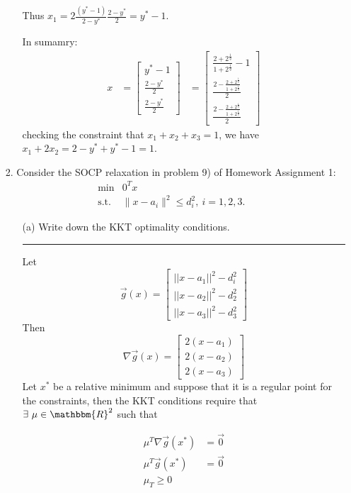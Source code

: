 \documentclass{article} %
\newcommand{\R}{\mathbbm{R}}
\begin{document}
\begin{enumerate}
\begin{itemize}
Thus $x_1 = 2 \frac{(y^{*} - 1) }{ 2 - y^{*}}  \frac{2 - y^{*}}{2} = y^{*} - 1$. 

In sumamry:
\begin{equation*}
\begin{aligned}
x &= \begin{bmatrix}  y^{*} - 1 \\ \frac{2 - y^{*}}{2} \\ \frac{2 - y^{*}}{2} \end{bmatrix} 
&= \begin{bmatrix} \frac{2 + 2^{\frac{1}{q}}}{1 + 2^{\frac{1}{q}}} - 1 \\ \frac{2 - \frac{2 + 2^{\frac{1}{q}}}{1 + 2^{\frac{1}{q}}}}{2} \\ \frac{2 - \frac{2 + 2^{\frac{1}{q}}}{1 + 2^{\frac{1}{q}}}}{2} \end{bmatrix} 
\end{aligned}
\end{equation*}
checking the constraint that $x_1 + x_2 + x_3 = 1$, we have $x_1 + 2x_2 = 2 - y^{*} + y^{*} - 1 = 1$. 


\end{itemize}

\item[2.] Consider the SOCP relaxation in problem 9) of Homework Assignment 1:
\[\begin{array}{rcl}
\min          & 0^Tx &\\
\mbox{s.t.} &\|x-a_i\|^2\le d^2_i,\ i=1,2,3.
\end{array}
\]
\begin{itemize}
\item[(a)] Write down the KKT optimality conditions. 


\rule{\textwidth}{1pt}

Let \[ \vec{g}(x) = \begin{bmatrix} || x - a_1||^2 - d_i^2 \\ || x - a_2||^2 - d_2^2 \\ || x - a_3||^2 - d_3^2 \end{bmatrix} \] 
Then \[ \nabla \vec{g}(x) = \begin{bmatrix} 2(x - a_1) \\ 2( x - a_2) \\ 2( x - a_3) \end{bmatrix} \] 
Let $x^{*}$ be a relative minimum and suppose that it is a regular point for the constraints, then the KKT conditions require that $\exists \mbox{ } \mu \in \R^{2}$ such that 

\begin{equation*}
\begin{aligned}
\mu^T  \nabla \vec{g}(x^{*}) &= \vec{0} \\ 
\mu^T  \vec{g}(x^{*}) &= \vec{0} \\ 
\mu_T \geq 0
\end{aligned}
\end{equation*}



\end{itemize}
\end{enumerate}
\end{document}
